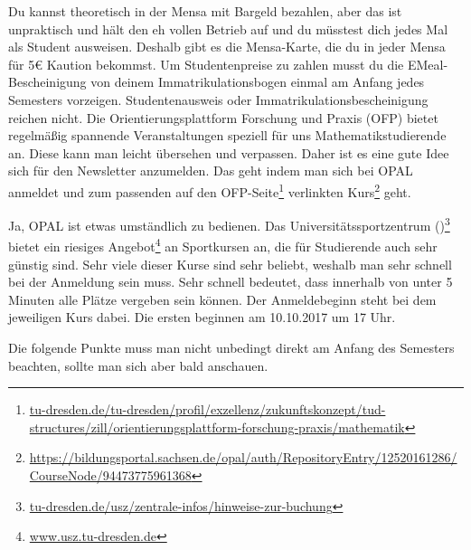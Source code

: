 \documentclass{scrartcl}
\begin{document}
\begin{description}
   Du kannst theoretisch in der Mensa mit Bargeld bezahlen,
    aber das ist unpraktisch und hält den eh vollen Betrieb auf und
    du müsstest dich jedes Mal als Student ausweisen.
    Deshalb gibt es die Mensa-Karte,
    die du in jeder Mensa für 5€ Kaution bekommst.
    Um Studentenpreise zu zahlen musst du die EMeal-Bescheinigung von deinem Immatrikulationsbogen
    einmal am Anfang jedes Semesters vorzeigen.
    Studentenausweis oder Immatrikulationsbescheinigung reichen nicht.
   Die Orientierungsplattform Forschung und Praxis (OFP) bietet regelmäßig spannende Veranstaltungen
    speziell für uns Mathematikstudierende an.
    Diese kann man leicht übersehen und verpassen.
    Daher ist es eine gute Idee sich für den Newsletter anzumelden.
    Das geht indem man sich bei OPAL anmeldet und zum passenden auf den
    OFP-Seite\footnote{\url{tu-dresden.de/tu-dresden/profil/exzellenz/zukunftskonzept/tud-structures/zill/orientierungsplattform-forschung-praxis/mathematik}}
    verlinkten Kurs\footnote{\url{https://bildungsportal.sachsen.de/opal/auth/RepositoryEntry/12520161286/CourseNode/94473775961368}} geht.
    
    Ja, OPAL ist etwas umständlich zu bedienen.
     Das Universitätssportzentrum ()\footnote{\url{tu-dresden.de/usz/zentrale-infos/hinweise-zur-buchung}} bietet ein riesiges Angebot\footnote{\url{www.usz.tu-dresden.de}} an
    Sportkursen an, die für Studierende auch sehr günstig sind.
    Sehr viele dieser Kurse sind sehr beliebt, weshalb man sehr schnell bei der Anmeldung sein muss.
    Sehr schnell bedeutet, dass innerhalb von unter 5 Minuten alle Plätze vergeben sein können.
    Der Anmeldebeginn steht bei dem jeweiligen Kurs dabei. Die ersten beginnen am 10.10.2017 um 17 Uhr.
\end{description}
Die folgende Punkte muss man nicht unbedingt direkt am Anfang des Semesters beachten, sollte man
sich aber bald anschauen.
\end{document}
